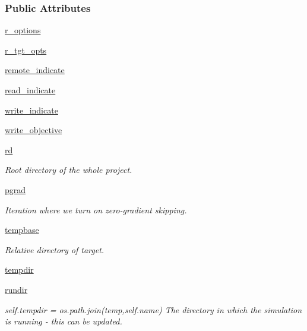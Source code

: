 \subsubsection*{Public Attributes}
\begin{DoxyCompactItemize}
\item 
\hyperlink{classsrc_1_1target_1_1RemoteTarget_a9b18ed91a6512dd19337fce9514a836d}{r\+\_\+options}
\item 
\hyperlink{classsrc_1_1target_1_1RemoteTarget_acbd51c8d6a2b9a6a993c0bf2340ffc63}{r\+\_\+tgt\+\_\+opts}
\item 
\hyperlink{classsrc_1_1target_1_1RemoteTarget_adfedcf928644b8e2df960bc06f8a3276}{remote\+\_\+indicate}
\item 
\hyperlink{classsrc_1_1target_1_1RemoteTarget_aafe08c71569bff42587c214d9ab973cc}{read\+\_\+indicate}
\item 
\hyperlink{classsrc_1_1target_1_1RemoteTarget_a1cd6b1fe76d7d69a6d26fd305fce8920}{write\+\_\+indicate}
\item 
\hyperlink{classsrc_1_1target_1_1RemoteTarget_a3b0391aefc69b38f4bc76c7168a60fe5}{write\+\_\+objective}
\item 
\hyperlink{classsrc_1_1target_1_1Target_af85bc6ed8a95bc598f2e72a7213b972e}{rd}
\begin{DoxyCompactList}\small\item\em Root directory of the whole project. \end{DoxyCompactList}\item 
\hyperlink{classsrc_1_1target_1_1Target_a5eb45ee670449762fb6a9885db9889aa}{pgrad}
\begin{DoxyCompactList}\small\item\em Iteration where we turn on zero-\/gradient skipping. \end{DoxyCompactList}\item 
\hyperlink{classsrc_1_1target_1_1Target_ae182b033fbe054ff2daa7659e69a7957}{tempbase}
\begin{DoxyCompactList}\small\item\em Relative directory of target. \end{DoxyCompactList}\item 
\hyperlink{classsrc_1_1target_1_1Target_a7cc95b1ec34fa75172c81469ff6e5d1d}{tempdir}
\item 
\hyperlink{classsrc_1_1target_1_1Target_a9f47e2d3fd02ea26469e880350bdb976}{rundir}
\begin{DoxyCompactList}\small\item\em self.\+tempdir = os.\+path.\+join(\textquotesingle{}temp\textquotesingle{},self.\+name) The directory in which the simulation is running -\/ this can be updated. \end{DoxyCompactList}\item 

\end{DoxyCompactItemize}
